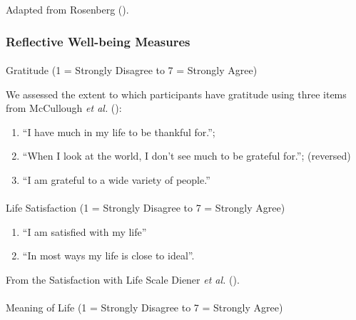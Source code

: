 \documentclass[
  single column]{article}
\makeatletter
\let\oldparagraph\paragraph
\renewcommand{\paragraph}{
    \@ifstar
      \xxxParagraphStar
      \xxxParagraphNoStar
  }
\newcommand{\xxxParagraphStar}[1]{\oldparagraph*{#1}\mbox{}}
\newcommand{\xxxParagraphNoStar}[1]{\oldparagraph{#1}\mbox{}}
\providecommand{\tightlist}{%
  \setlength{\itemsep}{0pt}\setlength{\parskip}{0pt}}\usepackage{longtable,booktabs,array}
\makeatother
\begin{document}
Adapted from Rosenberg ().

\subsubsection{Reflective Well-being
Measures}\label{reflective-well-being-measures}

\paragraph{Gratitude (1 = Strongly Disagree to 7 = Strongly
Agree)}\label{gratitude-1-strongly-disagree-to-7-strongly-agree}

We assessed the extent to which participants have gratitude using three
items from McCullough \emph{et al.}
():

\begin{enumerate}
\def\labelenumi{(\arabic{enumi})}
\tightlist
\item
  ``I have much in my life to be thankful for.'';
\item
  ``When I look at the world, I don't see much to be grateful for.'';
  (reversed)
\item
  ``I am grateful to a wide variety of people.''
\end{enumerate}

\paragraph{Life Satisfaction (1 = Strongly Disagree to 7 = Strongly
Agree)}\label{life-satisfaction-1-strongly-disagree-to-7-strongly-agree}

\begin{enumerate}
\def\labelenumi{\arabic{enumi}.}
\tightlist
\item
  ``I am satisfied with my life''\\
\item
  ``In most ways my life is close to ideal''.
\end{enumerate}

From the Satisfaction with Life Scale Diener \emph{et al.}
().

\paragraph{Meaning of Life (1 = Strongly Disagree to 7 = Strongly
Agree)}\label{meaning-of-life-1-strongly-disagree-to-7-strongly-agree}
\end{document}
